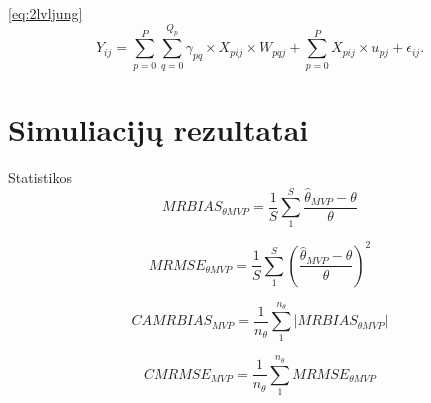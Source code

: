 \documentclass[12pt,a4paper]{article}
\begin{document}
\ref{eq:2lvljung}
\begin{equation} 
Y_{ij} =\sum^P_{p = 0} \sum^{Q_p}_{q=0}\gamma_{pq}\times X_{pij}\times W_{pqj}+\sum^P_{p = 0} X_{pij}\times u_{pj}+\epsilon_{ij}.
\end{equation}

\newpage
\section{Simuliacijų rezultatai}


\newpage

Statistikos
\[
MRBIAS_{\theta MVP}=\frac{1}{S}\sum_1^S\frac{\hat{\theta}_{MVP}-\theta}{\theta}
\]

\[
MRMSE_{\theta MVP}=\frac{1}{S}\sum_1^S\left(\frac{\hat{\theta}_{MVP}-\theta}{\theta}\right)^2
\]

\[
CAMRBIAS_{MVP}=\frac{1}{n_{\theta}}\sum_1^{n_{\theta}}|MRBIAS_{\theta MVP}|
\]

\[
CMRMSE_{MVP}=\frac{1}{n_{\theta}}\sum_1^{n_{\theta}}MRMSE_{\theta MVP}
\]
\end{document}
